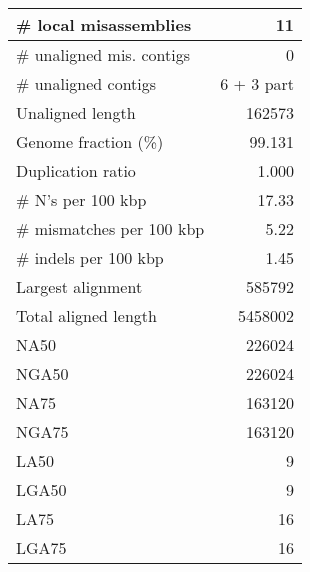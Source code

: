 \documentclass[12pt,a4paper]{article}
\begin{document}
\begin{table}[ht]
\begin{center}
\begin{tabular}{|l*{1}{|r}|}
\# local misassemblies & 11 \\ \hline
\# unaligned mis. contigs & 0 \\ \hline
\# unaligned contigs & 6 + 3 part \\ \hline
Unaligned length & 162573 \\ \hline
Genome fraction (\%) & 99.131 \\ \hline
Duplication ratio & 1.000 \\ \hline
\# N's per 100 kbp & 17.33 \\ \hline
\# mismatches per 100 kbp & 5.22 \\ \hline
\# indels per 100 kbp & 1.45 \\ \hline
Largest alignment & 585792 \\ \hline
Total aligned length & 5458002 \\ \hline
NA50 & 226024 \\ \hline
NGA50 & 226024 \\ \hline
NA75 & 163120 \\ \hline
NGA75 & 163120 \\ \hline
LA50 & 9 \\ \hline
LGA50 & 9 \\ \hline
LA75 & 16 \\ \hline
LGA75 & 16 \\ \hline
\end{tabular}
\end{center}
\end{table}
\end{document}
